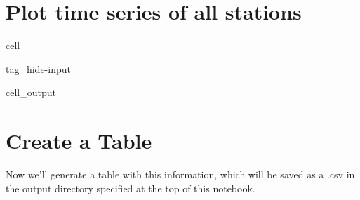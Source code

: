 \documentclass[letterpaper,10pt,english]{jupyterBook}
\begin{document}
\section{Plot time series of all stations}
\label{\detokenize{notebooks/FloodFrequency:plot-time-series-of-all-stations}}
\begin{sphinxuseclass}{cell}
\begin{sphinxuseclass}{tag_hide-input}\begin{sphinxVerbatimOutput}

\begin{sphinxuseclass}{cell_output}
\noindent{}

\end{sphinxuseclass}\end{sphinxVerbatimOutput}

\end{sphinxuseclass}
\end{sphinxuseclass}

\section{Create a Table}
\label{\detokenize{notebooks/FloodFrequency:create-a-table}}
\sphinxAtStartPar
Now we’ll generate a table with this information, which will be saved as a .csv in the output directory specified at the top of this notebook.
\end{document}
